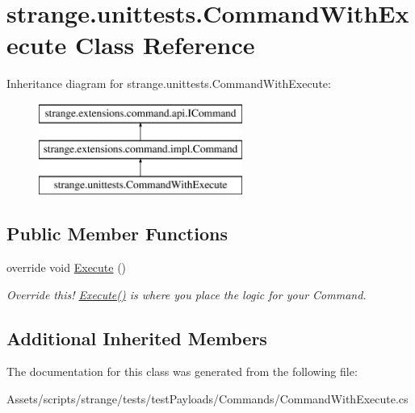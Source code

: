\hypertarget{classstrange_1_1unittests_1_1_command_with_execute}{\section{strange.\-unittests.\-Command\-With\-Execute Class Reference}
\label{classstrange_1_1unittests_1_1_command_with_execute}
}
Inheritance diagram for strange.\-unittests.\-Command\-With\-Execute\-:\begin{figure}[H]
\begin{center}
\leavevmode
\includegraphics[height=3.000000cm]{classstrange_1_1unittests_1_1_command_with_execute}
\end{center}
\end{figure}
\subsection*{Public Member Functions}
\begin{DoxyCompactItemize}
\item 
\hypertarget{classstrange_1_1unittests_1_1_command_with_execute_abc91c16581533e629ccbcce124371628}{override void \hyperlink{classstrange_1_1unittests_1_1_command_with_execute_abc91c16581533e629ccbcce124371628}{Execute} ()}\label{classstrange_1_1unittests_1_1_command_with_execute_abc91c16581533e629ccbcce124371628}

\begin{DoxyCompactList}\small\item\em Override this! {\ttfamily \hyperlink{classstrange_1_1unittests_1_1_command_with_execute_abc91c16581533e629ccbcce124371628}{Execute()}} is where you place the logic for your Command. \end{DoxyCompactList}\end{DoxyCompactItemize}
\subsection*{Additional Inherited Members}


The documentation for this class was generated from the following file\-:\begin{DoxyCompactItemize}
\item 
Assets/scripts/strange/tests/test\-Payloads/\-Commands/Command\-With\-Execute.\-cs\end{DoxyCompactItemize}

